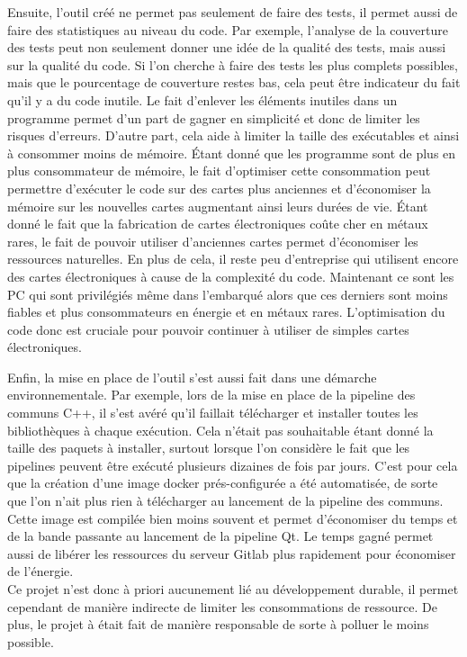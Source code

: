 \documentclass[a4paper]{article}
\begin{document}
Ensuite, l'outil créé ne permet pas seulement de faire des tests, il permet
aussi de faire des statistiques au niveau du code. Par exemple, l'analyse de la
couverture des tests peut non seulement donner une idée de la qualité des tests,
mais aussi sur la qualité du code. Si l'on cherche à faire des tests les plus
complets possibles, mais que le pourcentage de couverture restes bas, cela peut
être indicateur du fait qu'il y a du code inutile. Le fait d'enlever les
éléments inutiles dans un programme permet d'un part de gagner en simplicité et
donc de limiter les risques d'erreurs. D'autre part, cela aide à limiter la
taille des exécutables et ainsi à consommer moins de mémoire. Étant donné que
les programme sont de plus en plus consommateur de mémoire, le fait d'optimiser
cette consommation peut permettre d'exécuter le code sur des cartes plus
anciennes et d'économiser la mémoire sur les nouvelles cartes augmentant ainsi
leurs durées de vie. Étant donné le fait que la fabrication de cartes
électroniques coûte cher en métaux rares, le fait de pouvoir utiliser
d'anciennes cartes permet d'économiser les ressources naturelles. En plus de
cela, il reste peu d'entreprise qui utilisent encore des cartes électroniques à
cause de la complexité du code. Maintenant ce sont les PC qui sont privilégiés
même dans l'embarqué alors que ces derniers sont moins fiables et plus
consommateurs en énergie et en métaux rares. L'optimisation du code donc est
cruciale pour pouvoir continuer à utiliser de simples cartes électroniques.

Enfin, la mise en place de l'outil s'est aussi fait dans une démarche
environnementale. Par exemple, lors de la mise en place de la pipeline des
communs C++, il s'est avéré qu'il faillait télécharger et installer toutes les
bibliothèques à chaque exécution. Cela n'était pas souhaitable étant donné la
taille des paquets à installer, surtout lorsque l'on considère le fait que les
pipelines peuvent être exécuté plusieurs dizaines de fois par jours. C'est pour
cela que la création d'une image docker prés-configurée a été automatisée, de
sorte que l'on n'ait plus rien à télécharger au lancement de la pipeline des
communs. Cette image est compilée bien moins souvent et permet d'économiser du
temps et de la bande passante au lancement de la pipeline Qt. Le temps gagné
permet aussi de libérer les ressources du serveur Gitlab plus rapidement pour
économiser de l'énergie.\\

Ce projet n'est donc à priori aucunement lié au développement durable, il permet
cependant de manière indirecte de limiter les consommations de ressource. De
plus, le projet à était fait de manière responsable de sorte à polluer le moins
possible.
\end{document}
